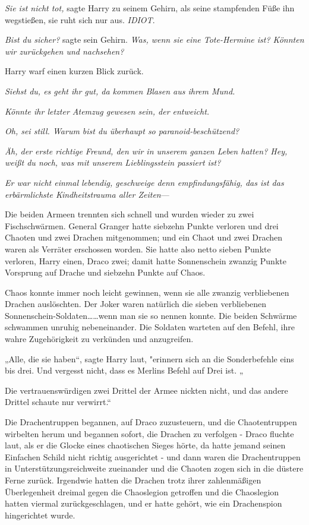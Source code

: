 {\emph{Sie ist nicht tot,} sagte Harry zu seinem Gehirn, als seine stampfenden Füße ihn wegstießen, sie ruht sich nur aus. \emph{IDIOT}.

\emph{Bist du sicher?} sagte sein Gehirn. \emph{Was, wenn sie eine Tote-Hermine ist? Könnten wir zurückgehen und nachsehen?}

Harry warf einen kurzen Blick zurück.

\emph{Siehst du, es geht ihr gut, da kommen Blasen aus ihrem Mund.}

\emph{Könnte ihr letzter Atemzug gewesen sein, der entweicht.}

\emph{Oh, sei still. Warum bist du überhaupt so paranoid-beschützend?}

\emph{Äh, der erste richtige Freund, den wir in unserem ganzen Leben hatten? Hey, weißt du noch, was mit unserem Lieblingsstein passiert ist?}

\emph{Er war nicht einmal lebendig, geschweige denn empfindungsfähig, das ist das erbärmlichste Kindheitstrauma aller Zeiten}—

Die beiden Armeen trennten sich schnell und wurden wieder zu zwei Fischschwärmen. General Granger hatte siebzehn Punkte verloren und drei Chaoten und zwei Drachen mitgenommen; und ein Chaot und zwei Drachen waren als Verräter erschossen worden. Sie hatte also netto sieben Punkte verloren, Harry einen, Draco zwei; damit hatte Sonnenschein zwanzig Punkte Vorsprung auf Drache und siebzehn Punkte auf Chaos.

Chaos konnte immer noch leicht gewinnen, wenn sie alle zwanzig verbliebenen Drachen auslöschten. Der Joker waren natürlich die sieben verbliebenen Sonnenschein-Soldaten……wenn man sie so nennen konnte. Die beiden Schwärme schwammen unruhig nebeneinander. Die Soldaten warteten auf den Befehl, ihre wahre Zugehörigkeit zu verkünden und anzugreifen.

„Alle, die sie haben“, sagte Harry laut, "erinnern sich an die Sonderbefehle eins bis drei. Und vergesst nicht, dass es Merlins Befehl auf Drei ist. „

Die vertrauenswürdigen zwei Drittel der Armee nickten nicht, und das andere Drittel schaute nur verwirrt.“

Die Drachentruppen begannen, auf Draco zuzusteuern, und die Chaotentruppen wirbelten herum und begannen sofort, die Drachen zu verfolgen - Draco fluchte laut, als er die Glocke eines chaotischen Sieges hörte, da hatte jemand seinen Einfachen Schild nicht richtig ausgerichtet - und dann waren die Drachentruppen in Unterstützungsreichweite zueinander und die Chaoten zogen sich in die düstere Ferne zurück. Irgendwie hatten die Drachen trotz ihrer zahlenmäßigen Überlegenheit dreimal gegen die Chaoslegion getroffen und die Chaoslegion hatten viermal zurückgeschlagen, und er hatte gehört, wie ein Drachenspion hingerichtet wurde.

}
